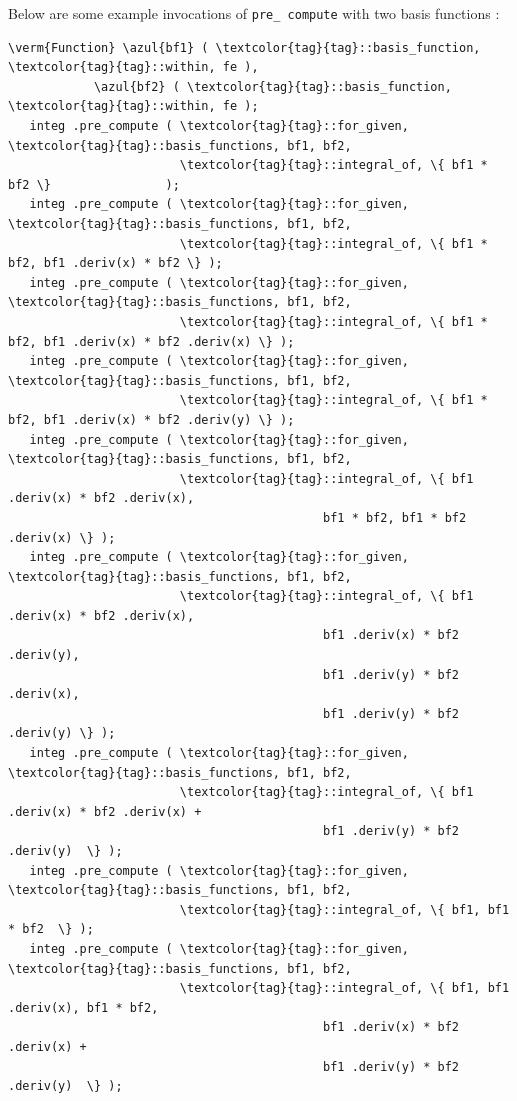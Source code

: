Below are some example invocations of {\small\tt pre\_\,compute} with two basis functions :
\begin{Verbatim}[commandchars=\\\{\},formatcom=\small\tt,
   baselinestretch=0.94,framesep=2mm                      ]
   \verm{Function} \azul{bf1} ( \textcolor{tag}{tag}::basis_function, \textcolor{tag}{tag}::within, fe ),
            \azul{bf2} ( \textcolor{tag}{tag}::basis_function, \textcolor{tag}{tag}::within, fe );
   integ .pre_compute ( \textcolor{tag}{tag}::for_given, \textcolor{tag}{tag}::basis_functions, bf1, bf2,
                        \textcolor{tag}{tag}::integral_of, \{ bf1 * bf2 \}                );
   integ .pre_compute ( \textcolor{tag}{tag}::for_given, \textcolor{tag}{tag}::basis_functions, bf1, bf2,
                        \textcolor{tag}{tag}::integral_of, \{ bf1 * bf2, bf1 .deriv(x) * bf2 \} );
   integ .pre_compute ( \textcolor{tag}{tag}::for_given, \textcolor{tag}{tag}::basis_functions, bf1, bf2,
                        \textcolor{tag}{tag}::integral_of, \{ bf1 * bf2, bf1 .deriv(x) * bf2 .deriv(x) \} );
   integ .pre_compute ( \textcolor{tag}{tag}::for_given, \textcolor{tag}{tag}::basis_functions, bf1, bf2,
                        \textcolor{tag}{tag}::integral_of, \{ bf1 * bf2, bf1 .deriv(x) * bf2 .deriv(y) \} );
   integ .pre_compute ( \textcolor{tag}{tag}::for_given, \textcolor{tag}{tag}::basis_functions, bf1, bf2,
                        \textcolor{tag}{tag}::integral_of, \{ bf1 .deriv(x) * bf2 .deriv(x),
                                            bf1 * bf2, bf1 * bf2 .deriv(x) \} );
   integ .pre_compute ( \textcolor{tag}{tag}::for_given, \textcolor{tag}{tag}::basis_functions, bf1, bf2,
                        \textcolor{tag}{tag}::integral_of, \{ bf1 .deriv(x) * bf2 .deriv(x),
                                            bf1 .deriv(x) * bf2 .deriv(y),
                                            bf1 .deriv(y) * bf2 .deriv(x),
                                            bf1 .deriv(y) * bf2 .deriv(y) \} );
   integ .pre_compute ( \textcolor{tag}{tag}::for_given, \textcolor{tag}{tag}::basis_functions, bf1, bf2,
                        \textcolor{tag}{tag}::integral_of, \{ bf1 .deriv(x) * bf2 .deriv(x) +
                                            bf1 .deriv(y) * bf2 .deriv(y)  \} );
   integ .pre_compute ( \textcolor{tag}{tag}::for_given, \textcolor{tag}{tag}::basis_functions, bf1, bf2,
                        \textcolor{tag}{tag}::integral_of, \{ bf1, bf1 * bf2  \} );
   integ .pre_compute ( \textcolor{tag}{tag}::for_given, \textcolor{tag}{tag}::basis_functions, bf1, bf2,
                        \textcolor{tag}{tag}::integral_of, \{ bf1, bf1 .deriv(x), bf1 * bf2,
                                            bf1 .deriv(x) * bf2 .deriv(x) +
                                            bf1 .deriv(y) * bf2 .deriv(y)  \} );
\end{Verbatim}

